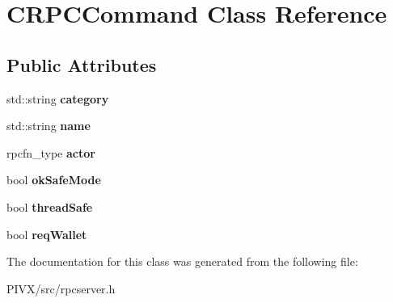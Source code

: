 \hypertarget{class_c_r_p_c_command}{}\section{C\+R\+P\+C\+Command Class Reference}
\label{class_c_r_p_c_command}
\subsection*{Public Attributes}
\begin{DoxyCompactItemize}
\item 
\mbox{\label{class_c_r_p_c_command_a27dd2710a5f94011f891f6a2efcec53a}} 
std\+::string {\bfseries category}
\item 
\mbox{\label{class_c_r_p_c_command_a8da584c0d2d98be22ebff74d3cf2221c}} 
std\+::string {\bfseries name}
\item 
\mbox{\label{class_c_r_p_c_command_a197a7eba565b4d9673537655fcbc1344}} 
rpcfn\+\_\+type {\bfseries actor}
\item 
\mbox{\label{class_c_r_p_c_command_a7f0b10e619917a3019f36ba5fa538adb}} 
bool {\bfseries ok\+Safe\+Mode}
\item 
\mbox{\label{class_c_r_p_c_command_a0377f0b0f803b3698121f3a2b35d67b1}} 
bool {\bfseries thread\+Safe}
\item 
\mbox{\label{class_c_r_p_c_command_a15bd6eb3af57f6382f15b2e927fdd445}} 
bool {\bfseries req\+Wallet}
\end{DoxyCompactItemize}


The documentation for this class was generated from the following file\+:\begin{DoxyCompactItemize}
\item 
P\+I\+V\+X/src/rpcserver.\+h\end{DoxyCompactItemize}
